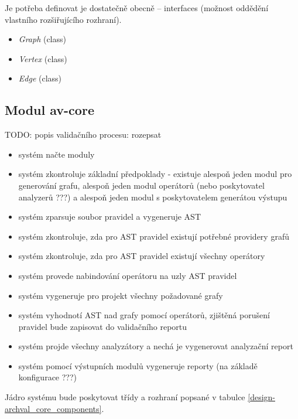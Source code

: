 Je potřeba definovat je dostatečně obecně -- interfaces (možnost oddědění vlastního rozšiřujícího rozhraní).

\begin{itemize}
\item \emph{Graph} (class)
\item \emph{Vertex} (class)
\item \emph{Edge} (class)
\end{itemize}

\subsection{Modul av-core}
TODO: popis validačního procesu: rozepsat
\begin{itemize}
\item systém načte moduly
\item systém zkontroluje základní předpoklady - existuje alespoň jeden modul pro generování grafu, alespoň jeden modul operátorů (nebo poskytovatel analyzerů ???) a alespoň jeden modul s poskytovatelem generátou výstupu
\item systém zparsuje soubor pravidel a vygeneruje AST
\item systém zkontroluje, zda pro AST pravidel existují potřebné providery grafů
\item systém zkontroluje, zda pro AST pravidel existují všechny operátory
\item systém provede nabindování operátoru na uzly AST pravidel
\item systém vygeneruje pro projekt všechny požadované grafy
\item systém vyhodnotí AST nad grafy pomocí operátorů, zjištěná porušení pravidel bude zapisovat do validačního reportu
\item systém projde všechny analyzátory a nechá je vygenerovat analyzační report
\item systém pomocí výstupních modulů vygeneruje reporty (na základě konfigurace ???)
\end{itemize}

Jádro systému bude poskytovat třídy a rozhraní popsané v tabulce \ref{design-archval_core_components}.

